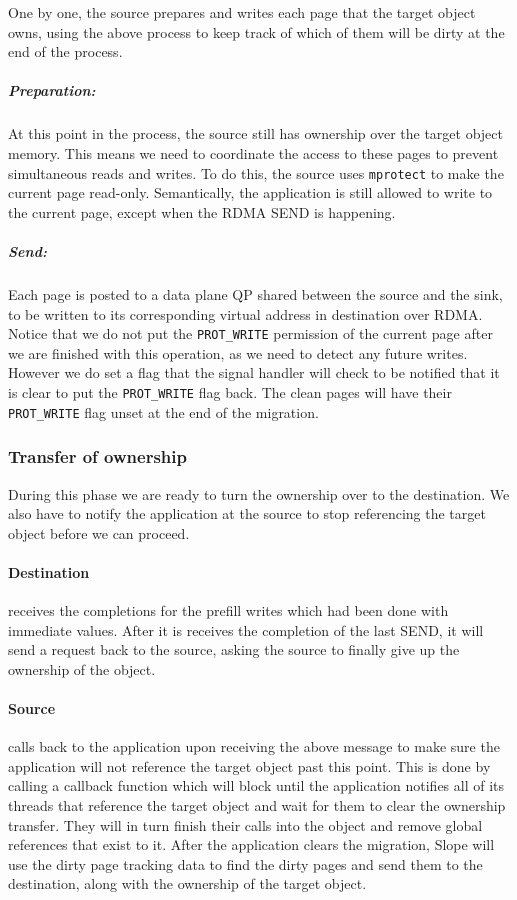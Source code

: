 
One by one, the source prepares and writes each page that the target object owns,
using the above process to keep track of which of them will be dirty at the end
of the process.

\subparagraph{Preparation:} At this point in the process, the source still
has ownership over the target object memory. This means we need to coordinate
the access to these pages to prevent simultaneous reads and writes. To do this,
the source uses \texttt{mprotect} to make the current page read-only.
Semantically, the application is still allowed to write to the current page,
except when the RDMA SEND is happening.

\subparagraph{Send:} Each page is posted to a data plane QP shared between the
source and the sink, to be written to its corresponding virtual address in
destination over RDMA. Notice that we do not put the \texttt{PROT\_WRITE} permission
of the current page after we are finished with this operation, as we need to
detect any future writes. However we do set a flag that the signal handler will
check to be notified that it is clear to put the \texttt{PROT\_WRITE} flag back.
The clean pages will have their \texttt{PROT\_WRITE} flag unset at the end of
the migration.


\subsubsection{Transfer of ownership}
During this phase we are ready to turn the ownership over to the destination.
We also have to notify the application at the source to stop referencing the
target object before we can proceed.

\paragraph{Destination} receives the completions for the prefill writes which
had been done with immediate values. After it is receives the completion of the
last SEND, it will send a request back to the source, asking the source to
finally give up the ownership of the object.

\paragraph{Source} calls back to the application upon receiving the above
message to make sure the application will not reference the target object
past this point. This is done by calling a callback function which will block
until the application notifies all of its threads that reference the target
object and wait for them to clear the ownership transfer. They will in turn
finish their calls into the object and remove global references that exist
to it. After the application clears the migration, Slope will use the dirty
page tracking data to find the dirty pages and send them to the destination,
along with the ownership of the target object.

